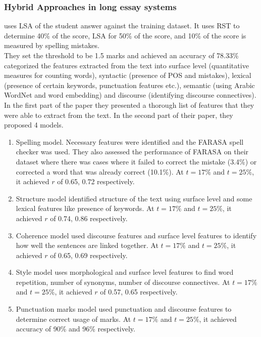 \documentclass{article}
\begin{document}
	\subsubsection*{Hybrid Approaches in long essay systems}
	\textbf{\textcite{5_aljouie2017schoolchildren}} uses LSA of the student answer against the training dataset. It uses RST to determine 40\% of the score, LSA for 50\% of the score, and 10\% of the score is measured by spelling mistakes. \\ They set the threshold to be 1.5 marks and achieved an accuracy of 78.33\% \\
	
	
	\textbf{\textcite{18_alqahtani2020svr}} categorized the features extracted from the text into surface level (quantitative measures for counting words), syntactic (presence of POS and mistakes), lexical (presence of certain keywords, punctuation features etc.), semantic (using Arabic WordNet and word embedding) and discourse (identifying discourse connectives). In the first part of the paper they presented a thorough list of features that they were able to extract from the text. In the second part of their paper, they proposed 4 models.
	\begin{enumerate}
		\item Spelling model. Necessary features were identified and the FARASA spell checker was used. They also assessed the performance of FARASA on their dataset where there was cases where it failed to correct the mistake (3.4\%) or corrected a word that was already correct (10.1\%). At $t = 17\%$ and $t = 25\%$, it achieved $r$ of 0.65, 0.72 respectively.
		\item Structure model identified structure of the text using surface level and some lexical features like presence of keywords. At $t = 17\%$ and $t = 25\%$, it achieved $r$ of 0.74, 0.86 respectively.
		\item Coherence model used discourse features and surface level features to identify how well the sentences are linked together. At $t = 17\%$ and $t = 25\%$, it achieved $r$ of 0.65, 0.69 respectively.
		\item Style model uses morphological and surface level features to find word repetition, number of synonyms, number of discourse connectives. At $t = 17\%$ and $t = 25\%$, it achieved $r$ of 0.57, 0.65 respectively.
		\item Punctuation marks model used punctuation and discourse features to determine correct usage of marks. At $t = 17\%$ and $t = 25\%$, it achieved accuracy of 90\% and 96\% respectively. 
	\end{enumerate}
\end{document}

